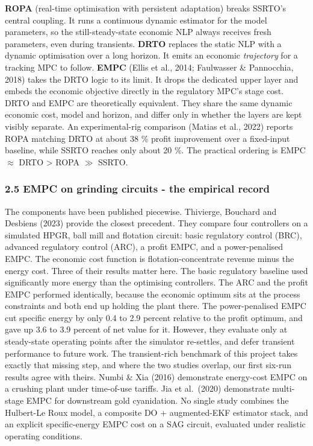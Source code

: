 \documentclass[
  14pt,
]{extarticle}
\begin{document}
\textbf{ROPA} (real-time optimisation with persistent adaptation) breaks
SSRTO's central coupling. It runs a continuous dynamic estimator for the
model parameters, so the still-steady-state economic NLP always receives
fresh parameters, even during transients. \textbf{DRTO} replaces the
static NLP with a dynamic optimisation over a long horizon. It emits an
economic \emph{trajectory} for a tracking MPC to follow. \textbf{EMPC}
(Ellis et al., 2014; Faulwasser \& Pannocchia, 2018) takes the DRTO
logic to its limit. It drops the dedicated upper layer and embeds the
economic objective directly in the regulatory MPC's stage cost. DRTO and
EMPC are theoretically equivalent. They share the same dynamic economic
cost, model and horizon, and differ only in whether the layers are kept
visibly separate. An experimental-rig comparison (Matias et al., 2022)
reports ROPA matching DRTO at about 38 \% profit improvement over a
fixed-input baseline, while SSRTO reaches only about 20 \%. The
practical ordering is EMPC $\approx$ DRTO \textgreater{} ROPA \(\gg\) SSRTO.

\subsubsection{2.5 EMPC on grinding circuits - the empirical
record}\label{empc-on-grinding-circuits---the-empirical-record}

The components have been published piecewise. Thivierge, Bouchard and
Desbiens (2023) provide the closest precedent. They compare four
controllers on a simulated HPGR, ball mill and flotation circuit: basic
regulatory control (BRC), advanced regulatory control (ARC), a profit
EMPC, and a power-penalised EMPC. The economic cost function is
flotation-concentrate revenue minus the energy cost. Three of their
results matter here. The basic regulatory baseline used significantly
more energy than the optimising controllers. The ARC and the profit EMPC
performed identically, because the economic optimum sits at the process
constraints and both end up holding the plant there. The power-penalised
EMPC cut specific energy by only 0.4 to 2.9 percent relative to the
profit optimum, and gave up 3.6 to 3.9 percent of net value for it.
However, they evaluate only at steady-state operating points after the
simulator re-settles, and defer transient performance to future work.
The transient-rich benchmark of this project takes exactly that missing
step, and where the two studies overlap, our first six-run results agree
with theirs. Numbi \& Xia
(2016) demonstrate energy-cost EMPC on a crushing plant under
time-of-use tariffs. Jia et al.~(2020) demonstrate multi-stage EMPC for
downstream gold cyanidation. No single study combines the Hulbert-Le
Roux model, a composite DO + augmented-EKF estimator stack, and an
explicit specific-energy EMPC cost on a SAG circuit, evaluated under
realistic operating conditions.
\end{document}
